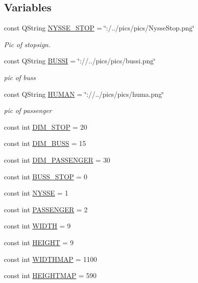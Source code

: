 \subsection*{Variables}
\begin{DoxyCompactItemize}
\item 
const Q\-String \hyperlink{actoritem_8hh_aa4b129297bf7c3a2ab33895c4ec37ade}{N\-Y\-S\-S\-E\-\_\-\-S\-T\-O\-P} = \char`\"{}\-:/../pics/pics/Nysse\-Stop.\-png\char`\"{}
\begin{DoxyCompactList}\small\item\em Pic of stopsign. \end{DoxyCompactList}\item 
const Q\-String \hyperlink{actoritem_8hh_aedf8524adc61b4d09d86db4fa2f207d2}{B\-U\-S\-S\-I} = \char`\"{}\-://../pics/pics/bussi.\-png\char`\"{}
\begin{DoxyCompactList}\small\item\em pic of buss \end{DoxyCompactList}\item 
const Q\-String \hyperlink{actoritem_8hh_a919ee1b297d205cded0f0dc03ade1cfd}{H\-U\-M\-A\-N} = \char`\"{}\-://../pics/pics/huma.\-png\char`\"{}
\begin{DoxyCompactList}\small\item\em pic of passenger \end{DoxyCompactList}\item 
const int \hyperlink{actoritem_8hh_abd028a1a48c574e726a4a904fff0a08c}{D\-I\-M\-\_\-\-S\-T\-O\-P} = 20
\item 
const int \hyperlink{actoritem_8hh_a0206546ca28fb9fca0c00861c5843dd5}{D\-I\-M\-\_\-\-B\-U\-S\-S} = 15
\item 
const int \hyperlink{actoritem_8hh_a94bb4115dc75d86789f2424ba4efcbdc}{D\-I\-M\-\_\-\-P\-A\-S\-S\-E\-N\-G\-E\-R} = 30
\item 
const int \hyperlink{actoritem_8hh_a65e7f70d9c573d5bfd13804a406fc067}{B\-U\-S\-S\-\_\-\-S\-T\-O\-P} = 0
\item 
const int \hyperlink{actoritem_8hh_a184d5b62435541e060c4dd4f179bec92}{N\-Y\-S\-S\-E} = 1
\item 
const int \hyperlink{actoritem_8hh_ad93711fcc7685c6b7a6530eda7984a55}{P\-A\-S\-S\-E\-N\-G\-E\-R} = 2
\item 
const int \hyperlink{actoritem_8hh_a9649ab8139c4c2ea5c93625b30d92a05}{W\-I\-D\-T\-H} = 9
\item 
const int \hyperlink{actoritem_8hh_af728b7647e0b8c49832983a31f9a2e9b}{H\-E\-I\-G\-H\-T} = 9
\item 
const int \hyperlink{actoritem_8hh_ac6d267250f70896f48d1e093f743f160}{W\-I\-D\-T\-H\-M\-A\-P} = 1100
\item 
const int \hyperlink{actoritem_8hh_a886d83c45b179176441711e5dca0a4d7}{H\-E\-I\-G\-H\-T\-M\-A\-P} = 590
\end{DoxyCompactItemize}


